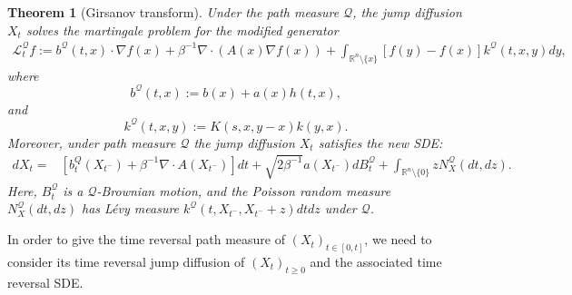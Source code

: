\documentclass[10pt]{article}
\newtheorem{thm}{Theorem}[section]
\theoremstyle{definition}
\theoremstyle{remark}
\numberwithin{equation}{section}
\begin{document}
\begin{thm}[Girsanov transform]
Under the path measure $\mathcal{Q}$, the jump diffusion $X_t$ solves the martingale problem for the modified generator
\begin{align}
    \mathcal{L}_t^{\mathcal{Q}}f := b^{\mathcal{Q}}(t,x) \cdot\nabla f(x) + \beta^{-1} \nabla\cdot (A(x)\nabla f(x)) +   \int_{\mathbb{R}^{n}\setminus \{x\}} [f(y)-f(x)] k^{\mathcal{Q}}(t,x,y)dy,
\end{align}
where 
\begin{equation*}
    b^{\mathcal{Q}}(t,x):= b(x) + a(x) h(t,x),
\end{equation*}
and
\begin{equation*}
    k^{\mathcal{Q}}(t,x,y):= K(s,x,y -x)k(y,x).
\end{equation*}
Moreover, under path measure $\mathcal{Q}$ the jump diffusion $X_t$ satisfies the new SDE:
\begin{align}
 dX_t = & \left[ b_t^{Q}(X_{t^-}) + \beta^{-1}\nabla \cdot A(X_{t^-}) \right]dt + \sqrt{2\beta^{-1}} a(X_{t^-})dB^{\mathcal{Q}}_t + \int_{\mathbb{R}^n \setminus\{0\}} z N^{\mathcal{Q}}_X(dt,dz).
\end{align}
Here, $B^{\mathcal{Q}}_t$ is a $\mathcal{Q}$-Brownian motion, and the Poisson random measure $N^{\mathcal{Q}}_X(dt,dz)$ has L\'{e}vy measure $k^{\mathcal{Q}}(t,X_{t^{-}}, X_{t^{-}}+z)dtdz$ under $\mathcal{Q}$.
\end{thm}

In order to give the time reversal path measure of $(X_t)_{t\in [0,t]}$, we need to consider its time reversal jump diffusion of $(X_t)_{t\geq 0}$ and the associated time reversal SDE.
\end{document}
